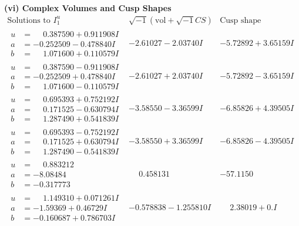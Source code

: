 \documentclass[1p]{elsarticle_modified}
\theoremstyle{definition}
\newcommand{\I}{\sqrt{-1}}
\begin{document}
\newpage\flushleft \textbf{(vi) Complex Volumes and Cusp Shapes}
$$\begin{array}{c|c|c}  
\text{Solutions to }I^u_{1}& \I (\text{vol} + \sqrt{-1}CS) & \text{Cusp shape}\\
 \hline 
\begin{aligned}
u &= \phantom{-}0.387590 + 0.911908 I \\
a &= -0.252509 - 0.478840 I \\
b &= \phantom{-}1.071600 + 0.110579 I\end{aligned}
 & -2.61027 - 2.03740 I & -5.72892 + 3.65159 I \\ \hline\begin{aligned}
u &= \phantom{-}0.387590 - 0.911908 I \\
a &= -0.252509 + 0.478840 I \\
b &= \phantom{-}1.071600 - 0.110579 I\end{aligned}
 & -2.61027 + 2.03740 I & -5.72892 - 3.65159 I \\ \hline\begin{aligned}
u &= \phantom{-}0.695393 + 0.752192 I \\
a &= \phantom{-}0.171525 - 0.630794 I \\
b &= \phantom{-}1.287490 + 0.541839 I\end{aligned}
 & -3.58550 - 3.36599 I & -6.85826 + 4.39505 I \\ \hline\begin{aligned}
u &= \phantom{-}0.695393 - 0.752192 I \\
a &= \phantom{-}0.171525 + 0.630794 I \\
b &= \phantom{-}1.287490 - 0.541839 I\end{aligned}
 & -3.58550 + 3.36599 I & -6.85826 - 4.39505 I \\ \hline\begin{aligned}
u &= \phantom{-}0.883212\phantom{ +0.000000I} \\
a &= -8.08484\phantom{ +0.000000I} \\
b &= -0.317773\phantom{ +0.000000I}\end{aligned}
 & \phantom{-}0.458131\phantom{ +0.000000I} & -57.1150\phantom{ +0.000000I} \\ \hline\begin{aligned}
u &= \phantom{-}1.149310 + 0.071261 I \\
a &= -1.59369 + 0.46729 I \\
b &= -0.160687 + 0.786703 I\end{aligned}
 & -0.578838 - 1.255810 I & \phantom{-}2.38019 + 0. I\phantom{ +0.000000I} \\ \hline\begin{aligned}

\end{aligned}
\end{array}$$
\end{document}
